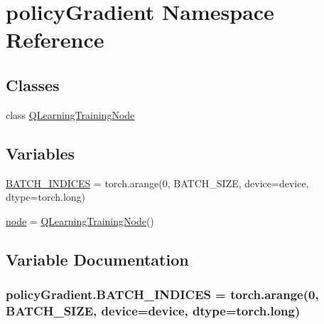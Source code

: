 \hypertarget{namespacepolicy_gradient}{}\section{policy\+Gradient Namespace Reference}
\label{namespacepolicy_gradient}
\subsection*{Classes}
\begin{DoxyCompactItemize}
\item 
class \hyperlink{classpolicy_gradient_1_1_q_learning_training_node}{Q\+Learning\+Training\+Node}
\end{DoxyCompactItemize}
\subsection*{Variables}
\begin{DoxyCompactItemize}
\item 
\hyperlink{namespacepolicy_gradient_aa0f8d14805eeb0190927d1e0610429fa}{B\+A\+T\+C\+H\+\_\+\+I\+N\+D\+I\+C\+ES} = torch.\+arange(0, B\+A\+T\+C\+H\+\_\+\+S\+I\+ZE, device=device, dtype=torch.\+long)
\item 
\hyperlink{namespacepolicy_gradient_ac222664eb440174c418a8dbce461d1ed}{node} = \hyperlink{classpolicy_gradient_1_1_q_learning_training_node}{Q\+Learning\+Training\+Node}()
\end{DoxyCompactItemize}


\subsection{Variable Documentation}
\subsubsection[{\texorpdfstring{B\+A\+T\+C\+H\+\_\+\+I\+N\+D\+I\+C\+ES}{BATCH_INDICES}}]{\setlength{\rightskip}{0pt plus 5cm}policy\+Gradient.\+B\+A\+T\+C\+H\+\_\+\+I\+N\+D\+I\+C\+ES = torch.\+arange(0, B\+A\+T\+C\+H\+\_\+\+S\+I\+ZE, device=device, dtype=torch.\+long)}\hypertarget{namespacepolicy_gradient_aa0f8d14805eeb0190927d1e0610429fa}{}\label{namespacepolicy_gradient_aa0f8d14805eeb0190927d1e0610429fa}


